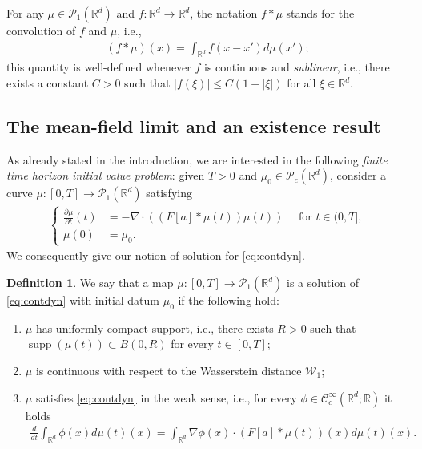 \documentclass[A4paper,11pt]{article}
\theoremstyle{definition}
\newtheorem{definition}[theorem]{Definition}
\newcommand{\R}{\mathbb{R}}
\newcommand{\W}{\mathcal{W}}
\newcommand{\PP}{\mathcal{P}_1}
\newcommand{\PC}{\mathcal{P}_c}
\DeclareMathOperator{\supp}{supp}
\begin{document}
For any $\mu \in \PP(\R^d)$ and $f: \R^d \to \R^d$, the notation $f * \mu$ stands for the convolution of $f$ and $\mu$, i.e.,
\begin{align*}
(f * \mu)(x) = \int_{\R^d} f(x - x') d\mu(x');
\end{align*}
this quantity is well-defined whenever $f$ is continuous and \emph{sublinear}, i.e., there exists a constant $C > 0$ such that $| f(\xi) | \leq C (1 + |\xi|)$ for all $\xi \in \R^d$.

\subsection{The mean-field limit and an existence result}

As already stated in the introduction, we are interested in the following \textit{finite time horizon initial value problem}: given $T > 0$ and $\mu_0 \in \PC(\R^d)$, consider a curve $\mu:[0,T]\rightarrow \PP(\R^d)$ satisfying
\begin{align}\label{eq:contdyn}
\left\{\begin{aligned}
\frac{\partial \mu}{\partial t}(t) &= -\nabla \cdot ((F[a]*\mu(t))\mu(t)) \quad \text{ for } t \in (0,T],\\
\mu(0) &=\mu_0.
\end{aligned}\right.
\end{align}
We consequently give our notion of solution for \eqref{eq:contdyn}.

\begin{definition}
We say that a map $\mu:[0,T]\rightarrow\PP(\R^d)$ is a solution of \eqref{eq:contdyn} with initial datum $\mu_0$ if the following hold:
\begin{enumerate}
\item $\mu$ has uniformly compact support, i.e., there exists $R > 0$ such that $\supp(\mu(t)) \subset B(0,R)$ for every $t \in [0,T]$;
\item $\mu$ is continuous with respect to the Wasserstein distance $\W_1$;
\item $\mu$ satisfies \eqref{eq:contdyn} in the weak sense, i.e., for every $\phi \in \mathcal{C}^{\infty}_c(\R^d;\R)$ it holds
\begin{align*}
\frac{d}{dt} \int_{\R^d} \phi(x) d\mu(t)(x) = \int_{\R^d} \nabla \phi(x) \cdot (F[a]*\mu(t))(x) d\mu(t)(x).
\end{align*}
\end{enumerate}
\end{definition}
\end{document}
